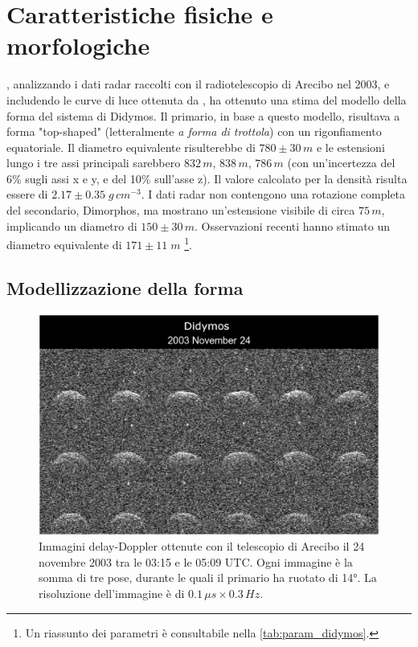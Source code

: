 \documentclass[a4paper,11pt,openright]{book}
\begin{document}
\section{Caratteristiche fisiche e morfologiche}
\citet{naidu_radar_2020}, analizzando i dati radar raccolti con il radiotelescopio di Arecibo nel 2003, e includendo le curve di luce ottenuta da \citet{pravec_photometric_2006}, ha ottenuto una stima del modello della forma del sistema di Didymos. Il primario, in base a questo modello, risultava a forma "top-shaped" (letteralmente \textit{a forma di trottola}) con un rigonfiamento equatoriale. Il diametro equivalente risulterebbe di $780\pm 30\,m$ e le estensioni lungo i tre assi principali sarebbero $832\,m$, $838\,m$, $786\,m$ (con un'incertezza del 6\% sugli assi x e y, e del 10\% sull'asse z). Il valore calcolato per la densità risulta essere di $2.17\pm 0.35\;g\,cm^{-3}$. I dati radar non contengono una rotazione completa del secondario, Dimorphos, ma mostrano un'estensione visibile di circa $75\,m$, implicando un diametro di $150\pm 30\,m$. Osservazioni recenti hanno stimato un diametro equivalente di $171\pm 11\; m$ \citep{scheirich_preimpact_2022}\footnote{Un riassunto dei parametri è consultabile nella \cref{tab:param_didymos}.}.


\subsection{Modellizzazione della forma}\label{sec:shape_model}

\begin{figure}[!h]
    \centering
    \includegraphics[scale=1.3]{figure/didymos_241103.jpg}
    \caption[Immagini delay-Doppler ottenute con il telescopio di Arecibo.]{Immagini delay-Doppler ottenute con il telescopio di Arecibo il 24 novembre 2003 tra le 03:15 e le 05:09 UTC. Ogni immagine è la somma di tre pose, durante le quali il primario ha ruotato di 14°. La risoluzione dell'immagine è di $0.1\,\mu s\times 0.3\,Hz$. \citep{naidu_radar_2020}}
    \label{fig:didymos_241103}
\end{figure}
\end{document}

